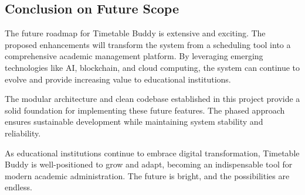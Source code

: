 \subsection{Conclusion on Future Scope}

The future roadmap for Timetable Buddy is extensive and exciting. The proposed enhancements will transform the system from a scheduling tool into a comprehensive academic management platform. By leveraging emerging technologies like AI, blockchain, and cloud computing, the system can continue to evolve and provide increasing value to educational institutions.

The modular architecture and clean codebase established in this project provide a solid foundation for implementing these future features. The phased approach ensures sustainable development while maintaining system stability and reliability.

As educational institutions continue to embrace digital transformation, Timetable Buddy is well-positioned to grow and adapt, becoming an indispensable tool for modern academic administration. The future is bright, and the possibilities are endless.
